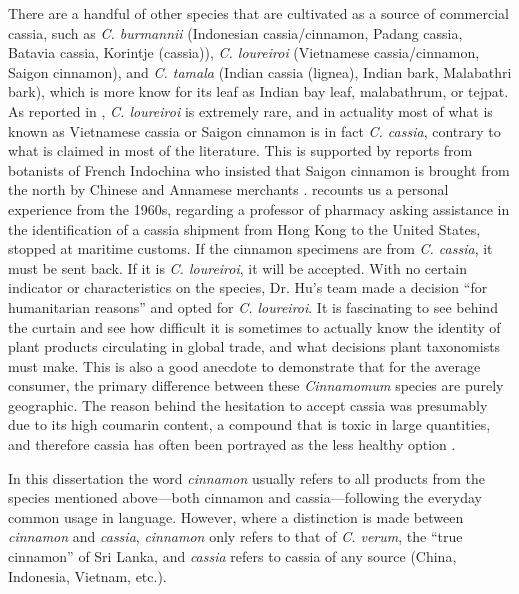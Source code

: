 There are a handful of other species that are cultivated as a source of commercial cassia, such as \textit{C. burmannii} (Indonesian cassia/cinnamon, Padang cassia, Batavia cassia, Korintje (cassia)), \textit{C. loureiroi} (Vietnamese cassia/cinnamon, Saigon cinnamon), and \textit{C. tamala} (Indian cassia (lignea), Indian bark, Malabathri bark), which is more know for its leaf as Indian bay leaf, malabathrum, or tejpat. As reported in \textcite[10]{ravindran_cinnamon_2004}, \textit{C. loureiroi} is extremely rare, and in actuality most of what is known as Vietnamese cassia or Saigon cinnamon is in fact \textit{C. cassia}, contrary to what is claimed in most of the literature. This is supported by reports from botanists of French Indochina who insisted that Saigon cinnamon is brought from the north by Chinese and Annamese merchants \autocite[400]{hu_food_2005}. \textcite{hu_food_2005} recounts us a personal experience from the 1960s, regarding a professor of pharmacy asking assistance in the identification of a cassia shipment from Hong Kong to the United States, stopped at maritime customs. If the cinnamon specimens are from \textit{C. cassia}, it must be sent back. If it is \textit{C. loureiroi}, it will be accepted. With no certain indicator or characteristics on the species, Dr. Hu's team made a decision ``for humanitarian reasons'' and opted for \textit{C. loureiroi}. It is fascinating to see behind the curtain and see how difficult it is sometimes to actually know the identity of plant products circulating in global trade, and what decisions plant taxonomists must make. This is also a good anecdote to demonstrate that for the average consumer, the primary difference between these \textit{Cinnamomum} species are purely geographic. The reason behind the hesitation to accept cassia was presumably due to its high coumarin content, a compound that is toxic in large quantities, and therefore cassia has often been portrayed as the less healthy option \autocite{dinesh_controversies_2015}.

\begin{note}
In this dissertation the word \textit{cinnamon} usually refers to all products from the species mentioned above---both cinnamon and cassia---following the everyday common usage in language. However, where a distinction is made between \textit{cinnamon} and \textit{cassia}, \textit{cinnamon} only refers to that of \textit{C. verum}, the ``true cinnamon'' of Sri Lanka, and \textit{cassia} refers to cassia of any source (China, Indonesia, Vietnam, etc.).
\end{note}

